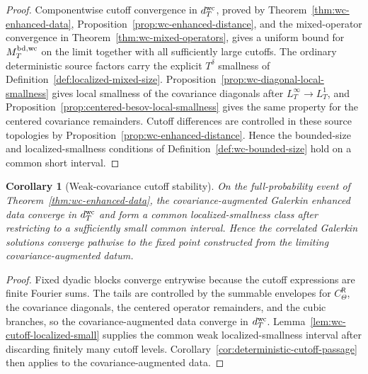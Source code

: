 \documentclass[10pt]{amsart}
\numberwithin{equation}{section}
\theoremstyle{plain}
\newtheorem{corollary}[theorem]{Corollary}
\theoremstyle{definition}
\theoremstyle{remark}
\begin{document}
\begin{proof}
Componentwise cutoff convergence in \(d_T^{\rm wc}\), proved by Theorem~\ref{thm:wc-enhanced-data}, Proposition~\ref{prop:wc-enhanced-distance}, and the mixed-operator convergence in Theorem~\ref{thm:wc-mixed-operators}, gives a uniform bound for \(M_T^{\rm bd,wc}\) on the limit together with all sufficiently large cutoffs.  The ordinary deterministic source factors carry the explicit \(T^\delta\) smallness of Definition~\ref{def:localized-mixed-size}.  Proposition~\ref{prop:wc-diagonal-local-smallness} gives local smallness of the covariance diagonals after \(L_T^\infty\to L_T^1\), and Proposition~\ref{prop:centered-besov-local-smallness} gives the same property for the centered covariance remainders.  Cutoff differences are controlled in these source topologies by Proposition~\ref{prop:wc-enhanced-distance}.  Hence the bounded-size and localized-smallness conditions of Definition~\ref{def:wc-bounded-size} hold on a common short interval.
\end{proof}

\begin{corollary}[Weak-covariance cutoff stability]\label{cor:wc-cutoff-stability}
On the full-probability event of Theorem~\ref{thm:wc-enhanced-data}, the covariance-augmented Galerkin enhanced data converge in \(d_T^{\rm wc}\) and form a common localized-smallness class after restricting to a sufficiently small common interval.  Hence the correlated Galerkin solutions converge pathwise to the fixed point constructed from the limiting covariance-augmented datum.
\end{corollary}

\begin{proof}
Fixed dyadic blocks converge entrywise because the cutoff expressions are finite Fourier sums.  The tails are controlled by the summable envelopes for \(C_\Theta^{\mathsf R}\), the covariance diagonals, the centered operator remainders, and the cubic branches, so the covariance-augmented data converge in \(d_T^{\rm wc}\).  Lemma~\ref{lem:wc-cutoff-localized-small} supplies the common weak localized-smallness interval after discarding finitely many cutoff levels.  Corollary~\ref{cor:deterministic-cutoff-passage} then applies to the covariance-augmented data.
\end{proof}
\end{document}
